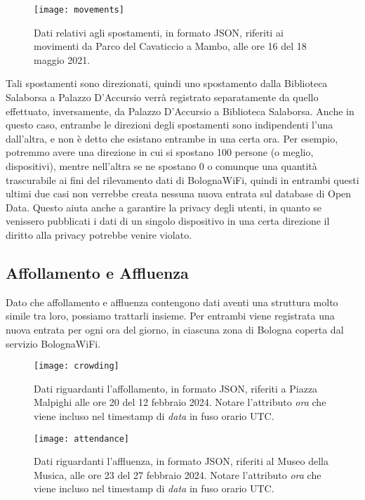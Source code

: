 \begin{figure}[H]
    \centering
    \texttt{[image: movements]}
    \caption[Struttura dei dati sugli spostamenti]{Dati relativi agli spostamenti, in formato JSON, riferiti ai movimenti da Parco del Cavaticcio a Mambo, alle ore 16 del 18 maggio 2021.}
    \label{fig:movements}
\end{figure}

Tali spostamenti sono direzionati, quindi uno spostamento dalla Biblioteca Salaborsa a Palazzo D'Accursio verrà registrato separatamente da quello effettuato, inversamente, da Palazzo D'Accursio a Biblioteca Salaborsa. Anche in questo caso, entrambe le direzioni degli spostamenti sono indipendenti l'una dall'altra, e non è detto che esistano entrambe in una certa ora. Per esempio, potremmo avere una direzione in cui si spostano 100 persone (o meglio, dispositivi), mentre nell'altra se ne spostano 0 o comunque una quantità trascurabile ai fini del rilevamento dati di BolognaWiFi, quindi in entrambi questi ultimi due casi non verrebbe creata nessuna nuova entrata sul database di Open Data. Questo aiuta anche a garantire la privacy degli utenti, in quanto se venissero pubblicati i dati di un singolo dispositivo in una certa direzione il diritto alla privacy potrebbe venire violato.

\subsection{Affollamento e Affluenza}
Dato che affollamento e affluenza contengono dati aventi una struttura molto simile tra loro, possiamo trattarli insieme. Per entrambi viene registrata una nuova entrata per ogni ora del giorno, in ciascuna zona di Bologna coperta dal servizio BolognaWiFi.

\begin{figure}[H]
    \centering
    \texttt{[image: crowding]}
    \caption[Struttura dei dati sull'affollamento]{Dati riguardanti l'affollamento, in formato JSON, riferiti a Piazza Malpighi alle ore 20 del 12 febbraio 2024. Notare l'attributo \textit{ora} che viene incluso nel timestamp di \textit{data} in fuso orario UTC.}
    \label{fig:crowding}
\end{figure}

\begin{figure}[H]
    \centering
    \texttt{[image: attendance]}
    \caption[Struttura dei dati sull'affluenza]{Dati riguardanti l'affluenza, in formato JSON, riferiti al Museo della Musica, alle ore 23 del 27 febbraio 2024. Notare l'attributo \textit{ora} che viene incluso nel timestamp di \textit{data} in fuso orario UTC.}
    \label{fig:attendance}
\end{figure}

